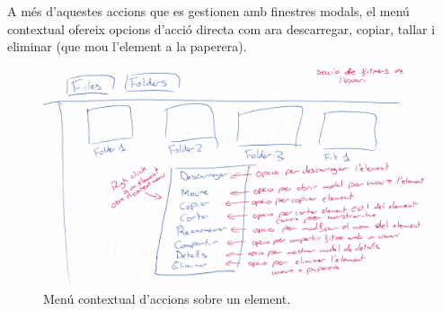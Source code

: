 A més d'aquestes accions que es gestionen amb finestres modals, el menú contextual ofereix opcions d'acció directa com ara descarregar, copiar, tallar i eliminar (que mou l'element a la paperera).

\begin{figure}[H]
    \centering
    \includegraphics[width=\textwidth]{Figures/interficies/react-opcions-root.jpg}
    \caption{Menú contextual d'accions sobre un element.}
    \label{fig:react-opcions-root}
\end{figure}

